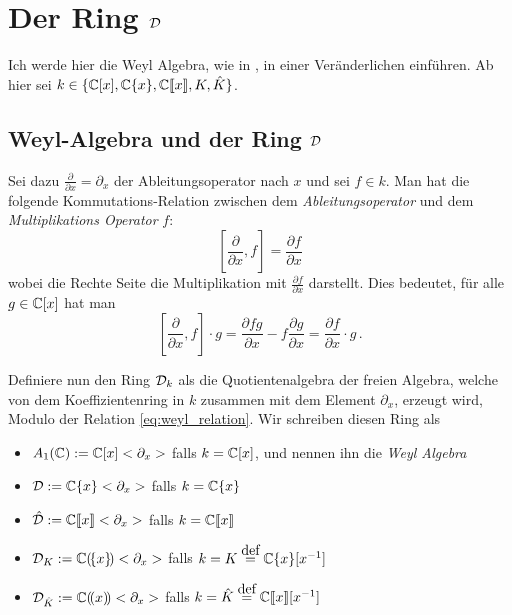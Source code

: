 
\chapter{Der Ring $\mathcal{D}$}
Ich werde hier die Weyl Algebra, wie in \cite[Chapter~1]{sabbah_cimpa90}, in
einer Veränderlichen einführen. 
Ab hier sei $k\in \{ \mathbb{C}[x],{\mathbb C \{x\}},{\mathbb C\llbracket x\rrbracket},K,\hat K \}$.

\section{Weyl-Algebra und der Ring $\mathcal{D}$} 
Sei dazu $\frac{\partial}{\partial x}=\partial_x$ der Ableitungsoperator nach
$x$ und sei $f \in k$.
Man hat die folgende
Kommutations-Relation zwischen dem \emph{Ableitungsoperator} und dem
\emph{Multiplikations Operator} $f$:
\begin{equation}\label{eq:weyl_relation}
[\frac{\partial}{\partial x},f]=\frac{\partial f}{\partial x}
\end{equation}
wobei die Rechte Seite die Multiplikation mit $\frac{\partial f}{\partial x}$
darstellt. Dies bedeutet, für alle $g\in\mathbb{C}[x]$ hat man
\[
[\frac{\partial}{\partial x},f]\cdot g
=\frac{\partial fg}{\partial x} - f\frac{\partial g}{\partial x}
=\frac{\partial f}{\partial x} \cdot g \,.
\]
\begin{defn}
Definiere nun den Ring $\mathcal{D}_k$ als die Quotientenalgebra der freien Algebra,
welche von dem Koeffizientenring in $k$ zusammen mit dem Element $\partial_x$,
erzeugt wird, Modulo der Relation \eqref{eq:weyl_relation}.  Wir schreiben
diesen Ring als
\begin{itemize}
\item $A_1(\mathbb{C}):=\mathbb{C}[x]<\partial_x>$ falls $k=\mathbb{C}[x]$, und nennen ihn die
\emph{Weyl Algebra}
\item $\mathcal{D}:=\mathbb{C}\{x\}<\partial_x>$ falls $k=\mathbb{C}\{x\}$
\item $\hat{\mathcal{D}}:={\mathbb C\llbracket x\rrbracket}<\partial_x>$ falls $k={\mathbb C\llbracket x\rrbracket}$
\item $\mathcal{D}_K:={\mathbb C (\!\{x\}\!)}<\partial_x>$ falls
$k=K\overset{\mbox{def}}{=}\mathbb{C}\{x\}[x^{-1}]$
\item $\mathcal{D}_{\hat K}:={\mathbb C (\!(x)\!)}<\partial_x>$ falls $k=\hat
K\overset{\mbox{def}}{=}{\mathbb C\llbracket x\rrbracket}[x^{-1}]$
\end{itemize}
\end{defn}
